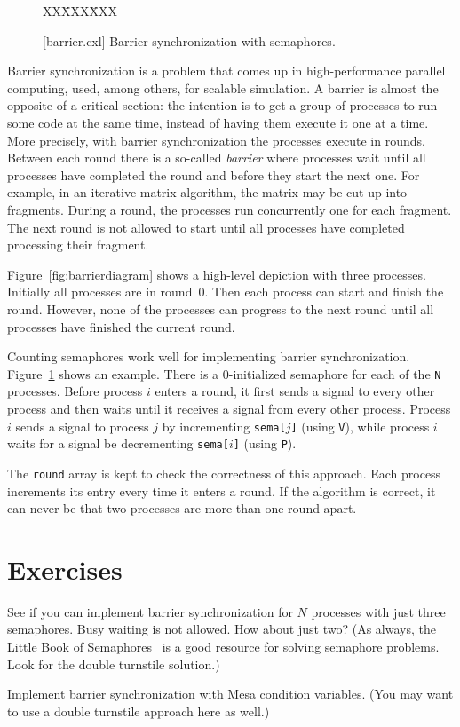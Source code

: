 \documentclass{report}
\newcommand{\cxlsource}[1]{
\begin{tabbing}
XX\=XXX\=XXX\kill
    
\end{tabbing}
}
\newenvironment{code}{
\tcolorbox
}{
\endtcolorbox
}
\begin{document}
\begin{figure}
\begin{code}
\cxlsource{barrier}
\end{code}
\caption{[barrier.cxl] Barrier synchronization with semaphores.}
\label{fig:barrier}
\end{figure}

Barrier synchronization is a problem that comes up in high-performance
parallel computing, used, among others, for scalable simulation.
A barrier is almost the opposite of a critical section:
the intention is to get a group of processes to run some code at the
same time, instead of having them execute it one at a time.
More precisely, with barrier synchronization the processes execute in rounds.
Between each round there is a so-called \emph{barrier} where processes wait
until all processes have completed the round and before they start the
next one.
For example, in an iterative matrix algorithm, the matrix may be
cut up into fragments.  During a round, the processes run concurrently
one for each fragment.  The next round is not allowed to start
until all processes have completed processing their fragment.

Figure~\ref{fig:barrierdiagram} shows a high-level depiction with three
processes.  Initially all processes are in round~0.  Then each process
can start and finish the round.  However, none of the processes can
progress to the next round until all processes have finished the
current round.

Counting semaphores work well for implementing barrier synchronization.
Figure~\ref{fig:barrier} shows an example.  There is a 0-initialized
semaphore for each of the \texttt{N} processes.
Before process $i$ enters a round, it first sends a signal to every
other process and then waits until it receives a signal from
every other process.  Process $i$ sends a signal to process $j$
by incrementing \texttt{sema[$j$]} (using \texttt{V}),
while process $i$ waits for a signal be decrementing \texttt{sema[$i$]}
(using \texttt{P}).

The \texttt{round} array is kept to check the correctness of this
approach.  Each process increments its entry every time it enters
a round.  If the algorithm is correct, it can never be that two processes
are more than one round apart.

\section*{Exercises}
\begin{problems}
\item See if you can implement barrier synchronization for $N$ processes
with just three semaphores.  Busy waiting is not allowed.  How about just two?
(As always, the Little Book of Semaphores~\cite{Downey09} is a good resource
for solving semaphore problems.  Look for the double turnstile solution.)
\item Implement barrier synchronization with Mesa condition variables.
(You may want to use a double turnstile approach here as well.)
\end{problems}
\end{document}
